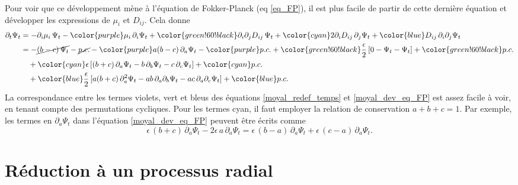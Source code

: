 \documentclass[openany,a4paper,12pt]{article}
\begin{document}
\par Pour voir que ce développement mène à l'équation de Fokker-Planck (eq \ref{eq_FP}), il est plus facile de partir de cette dernière équation et développer les expressions de $\mu_i$ et $D_{ij}$. Cela donne
%
\begin{equation}\label{moyal_dev_eq_FP}
\begin{split}
	\partial_t \Psi_t
	&= - \partial_i \mu_i \, \Psi_t
	- {\color{purple} \mu_i \, \partial_i \Psi_t }
	+ {\color{green!60!black} \partial_i\partial_j D_{ij} \, \Psi_t }
	+ {\color{cyan} 2 \partial_i D_{ij} \, \partial_j \Psi_t }
	+ {\color{blue} D_{ij} \,  \partial_i\partial_j \Psi_t } \\
	&= - \cancel{(b-c) \, \Psi_t} - \cancel{p.c.}
	- {\color{purple} a(b-c)\, \partial_a \Psi_t }
	- {\color{purple} p.c. }
	+ {\color{green!60!black} \frac \epsilon 2 \, [0-\Psi_t-\Psi_t] }
	+ {\color{green!60!black} p.c. } \\
	&\quad + {\color{cyan} \epsilon \, [ (b+c) \, \partial_a \Psi_t - b \, \partial_b \Psi_t - c \, \partial_c \Psi_t ] }
	+ {\color{cyan} p.c. } \\
	&\quad + {\color{blue} \frac \epsilon 2 \, [ a(b+c) \, \partial_a^2 \Psi_t - ab \, \partial_a\partial_b \Psi_t - ac \, \partial_a\partial_c \Psi_t ] }
	+ {\color{blue} p.c. }
\end{split} 
\end{equation}
%
La correspondance entre les termes violets, vert et bleus des équations \ref{moyal_redef_temps} et \ref{moyal_dev_eq_FP} est assez facile à voir, en tenant compte des permutations cycliques. Pour les termes cyan, il faut employer la relation de conservation $a+b+c=1$. Par exemple, les termes en $\partial_a\Psi_t$ dans l'équation \ref{moyal_dev_eq_FP} peuvent être écrits comme
%
\begin{equation}\label{moyal_terme_cyan_corresp}
	\epsilon\, (b+c)\, \partial_a\Psi_t -2\epsilon\, a\, \partial_a\Psi_t = \epsilon\, (b-a)\, \partial_a\Psi_t + \epsilon\, (c-a)\, \partial_a\Psi_t.
\end{equation}
%

\section{Réduction à un processus radial}
\label{section_stoch_averaging}
\end{document}

